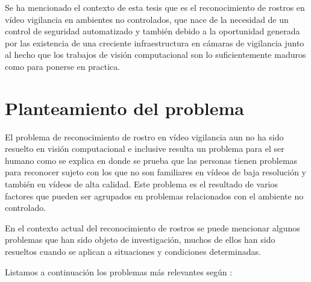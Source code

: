 Se ha mencionado el contexto de esta tesis que es el reconocimiento de rostros en vídeo vigilancia en ambientes no controlados, que nace de la necesidad de un control de seguridad automatizado y también debido a la oportunidad generada por las existencia de una creciente infraestructura en cámaras de vigilancia junto al hecho que los trabajos de visión computacional son lo suficientemente maduros como para ponerse en practica.


\section{Planteamiento del problema}\label{ssc:PlanteamientoProblema}
El problema de reconocimiento de rostro en vídeo vigilancia aun no ha sido resuelto en visión computacional e inclusive resulta un problema para el ser humano como se explica en \cite{burton1999face} donde se prueba que las personas tienen problemas para reconocer sujeto con los que no son familiares en vídeos de baja resolución y también en vídeos de alta calidad.
Este problema es el resultado de varios factores que pueden ser agrupados en problemas relacionados con el ambiente no controlado.

En el contexto actual del reconocimiento de rostros se puede mencionar algunos problemas que han sido objeto de investigación, muchos de ellos han sido resueltos cuando se aplican a situaciones y condiciones determinadas. 

Listamos a continuación  los problemas más relevantes según \cite{gross2001quo}:


